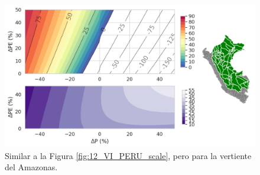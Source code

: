 \begin{figure}[ht!]
	\includegraphics[scale=.75]{Images/12_VI_Nivel_scale_Amazon.png}
	\centering
	\caption{Similar a la Figura \ref{fig:12_VI_PERU_scale}, pero para la vertiente del Amazonas.}
	\label{fig:12_VI_Nivel_scale_Amazon}
\end{figure}
